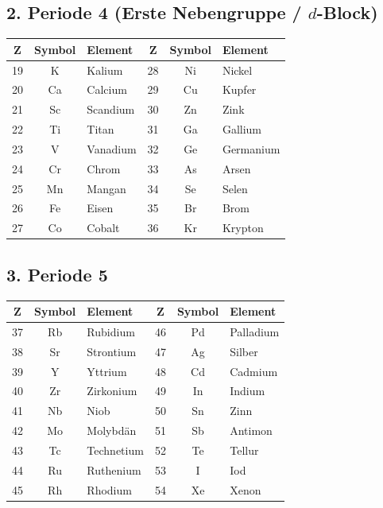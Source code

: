 \documentclass{article}
\begin{document}
	\subsection*{2. Periode 4 (Erste Nebengruppe / $d$-Block)}
	\begin{table}[htbp]
		\centering
		\small
		\begin{tabular}{cclccl}
			\toprule
			$\mathbf{Z}$ & \textbf{Symbol} & \textbf{Element} & $\mathbf{Z}$ & \textbf{Symbol} & \textbf{Element} \\
			\midrule
			19 & K  & Kalium    & 28 & Ni & Nickel \\
			20 & Ca & Calcium   & 29 & Cu & Kupfer \\
			21 & Sc & Scandium  & 30 & Zn & Zink \\
			22 & Ti & Titan     & 31 & Ga & Gallium \\
			23 & V  & Vanadium  & 32 & Ge & Germanium \\
			24 & Cr & Chrom     & 33 & As & Arsen \\
			25 & Mn & Mangan    & 34 & Se & Selen \\
			26 & Fe & Eisen     & 35 & Br & Brom \\
			27 & Co & Cobalt    & 36 & Kr & Krypton \\
			\bottomrule
		\end{tabular}
	\end{table}
	
	\subsection*{3. Periode 5}
	\begin{table}[htbp]
		\centering
		\small
		\begin{tabular}{cclccl}
			\toprule
			$\mathbf{Z}$ & \textbf{Symbol} & \textbf{Element} & $\mathbf{Z}$ & \textbf{Symbol} & \textbf{Element} \\
			\midrule
			37 & Rb & Rubidium   & 46 & Pd & Palladium \\
			38 & Sr & Strontium  & 47 & Ag & Silber \\
			39 & Y  & Yttrium    & 48 & Cd & Cadmium \\
			40 & Zr & Zirkonium  & 49 & In & Indium \\
			41 & Nb & Niob       & 50 & Sn & Zinn \\
			42 & Mo & Molybdän   & 51 & Sb & Antimon \\
			43 & Tc & Technetium & 52 & Te & Tellur \\
			44 & Ru & Ruthenium  & 53 & I  & Iod \\
			45 & Rh & Rhodium    & 54 & Xe & Xenon \\
			\bottomrule
		\end{tabular}
	\end{table}
	
\end{document}
